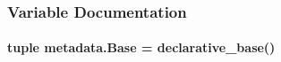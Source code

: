 \subsubsection{Variable Documentation}
\hypertarget{namespacemetadata_afb4cda46e96551cec78005b2e9e253d5}{
\paragraph[{Base}]{\setlength{\rightskip}{0pt plus 5cm}tuple metadata.\-Base = declarative\-\_\-base()}}\label{namespacemetadata_afb4cda46e96551cec78005b2e9e253d5}
